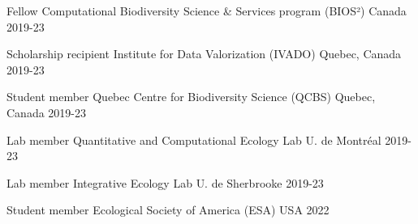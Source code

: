 

\begin{cvhonors}

  \cvhonor
    {Fellow} %
    {Computational Biodiversity Science \& Services program (BIOS²)} %
    {Canada} %
    {2019-23} %

  \cvhonor
    {Scholarship recipient} %
    {Institute for Data Valorization (IVADO)} %
    {Quebec, Canada} %
    {2019-23} %

  \cvhonor
    {Student member} %
    {Quebec Centre for Biodiversity Science (QCBS)} %
    {Quebec, Canada} %
    {2019-23} %

  \cvhonor
    {Lab member} %
    {Quantitative and Computational Ecology Lab} %
    {U. de Montréal} %
    {2019-23} %

  \cvhonor
    {Lab member} %
    {Integrative Ecology Lab} %
    {U. de Sherbrooke} %
    {2019-23} %

  \cvhonor
    {Student member} %
    {Ecological Society of America (ESA)} %
    {USA} %
    {2022} %

\end{cvhonors}
